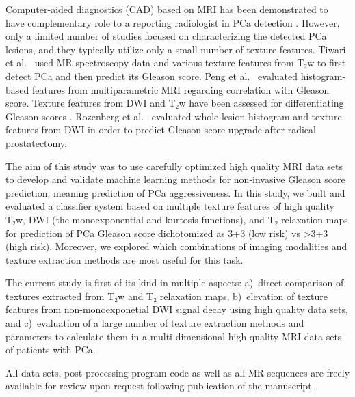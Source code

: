 Computer-aided diagnostics (CAD) based on MRI has been demonstrated to have
complementary role to a reporting radiologist in PCa detection \citep{Kwak2015,
Viswanath2012, Ginsburg2014}. However, only a limited number of studies focused
on characterizing the detected PCa lesions, and they typically utilize only a
small number of texture features. Tiwari et al.\ \cite{Tiwari2013} used MR
spectroscopy data and various texture features from T₂w to first detect PCa and
then predict its Gleason score. Peng et al.\ \cite{Peng2013} evaluated
histogram-based features from multiparametric MRI regarding correlation with
Gleason score. Texture features from DWI and T₂w have been assessed for
differentiating Gleason scores \citep{Wibmer2015, Vignati2015, Fehr2015}.
Rozenberg et al.\ \cite{Rozenberg2016} evaluated whole-lesion histogram and
texture features from DWI in order to predict Gleason score upgrade after
radical prostatectomy.

The aim of this study was to use carefully optimized high quality MRI data sets
to develop and validate machine learning methods for non-invasive Gleason score
prediction, meaning prediction of PCa aggressiveness. In this study, we built
and evaluated a classifier system based on multiple texture features of high
quality T₂w, DWI (the monoexponential and kurtosis functions), and T₂ relaxation
maps for prediction of PCa Gleason score dichotomized as 3+3 (low risk) vs >3+3
(high risk). Moreover, we explored which combinations of imaging modalities and
texture extraction methods are most useful for this task.

The current study is first of its kind in multiple aspects: a)~direct comparison
of textures extracted from T₂w and T₂ relaxation maps, b)~elevation of texture
features from non-monoexponetial DWI signal decay using high quality data sets,
and c)~evaluation of a large number of texture extraction methods and parameters
to calculate them in a multi-dimensional high quality MRI data sets of patients
with PCa.

All data sets, post-processing program code as well as all MR sequences are
freely available for review upon request following publication of the
manuscript.
